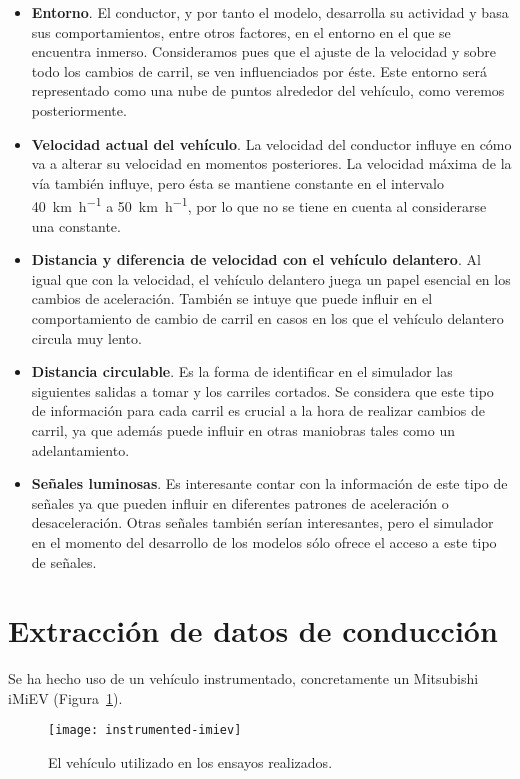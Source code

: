 \begin{itemize}
	\item \textbf{Entorno}. El conductor, y por tanto el modelo, desarrolla su actividad y basa sus comportamientos, entre otros factores, en el entorno en el que se encuentra inmerso. Consideramos pues que el ajuste de la velocidad y sobre todo los cambios de carril, se ven influenciados por éste. Este entorno será representado como una nube de puntos alrededor del vehículo, como veremos posteriormente.
	\item \textbf{Velocidad actual del vehículo}. La velocidad del conductor influye en cómo va a alterar su velocidad en momentos posteriores. La velocidad máxima de la vía también influye, pero ésta se mantiene constante en el intervalo \SI{40}{\kilo\meter\per\hour} a \SI{50}{\kilo\meter\per\hour}, por lo que no se tiene en cuenta al considerarse una constante.
	\item \textbf{Distancia y diferencia de velocidad con el vehículo delantero}. Al igual que con la velocidad, el vehículo delantero juega un papel esencial en los cambios de aceleración. También se intuye que puede influir en el comportamiento de cambio de carril en casos en los que el vehículo delantero circula muy lento.
	\item \textbf{Distancia circulable}. Es la forma de identificar en el simulador las siguientes salidas a tomar y los carriles cortados. Se considera que este tipo de información para cada carril es crucial a la hora de realizar cambios de carril, ya que además puede influir en otras maniobras tales como un adelantamiento.
	\item \textbf{Señales luminosas}. Es interesante contar con la información de este tipo de señales ya que pueden influir en diferentes patrones de aceleración o desaceleración. Otras señales también serían interesantes, pero el simulador en el momento del desarrollo de los modelos sólo ofrece el acceso a este tipo de señales.
\end{itemize}

\section{Extracción de datos de conducción}

Se ha hecho uso de un vehículo instrumentado, concretamente un Mitsubishi iMiEV (Figura~\ref{fig:instrumented-imiev}).

\begin{figure}
	\centering
	\texttt{[image: instrumented-imiev]}
	\caption[Vehículo instrumentado utilizado en los ensayos]{El vehículo utilizado en los ensayos realizados.}
	\label{fig:instrumented-imiev}
\end{figure}

